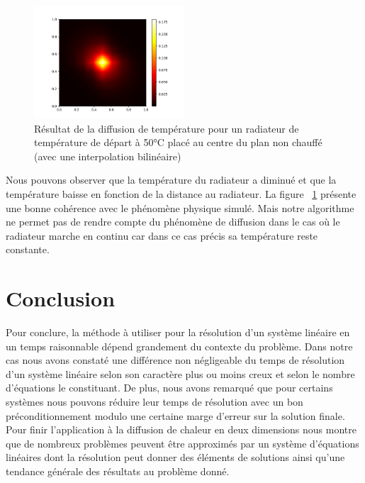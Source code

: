 \documentclass{article}
\begin{document}
\begin{figure}[htbp]
  \centering
  \includegraphics[width=0.5\textwidth]{images/radiateur_centre.png}
  \caption{Résultat de la diffusion de température pour un radiateur de température de départ à 50°C placé au centre du plan non chauffé (avec une interpolation bilinéaire)}
  \label{fig:radiateur_centre}
\end{figure}%

Nous pouvons observer que la température du radiateur a diminué et que la température baisse en fonction de la distance au radiateur. La figure ~\ref{fig:radiateur_centre} présente une bonne cohérence avec le phénomène physique simulé. Mais notre algorithme ne permet pas de rendre compte du phénomène de diffusion dans le cas où le radiateur marche en continu car dans ce cas précis sa température reste constante.







\section*{Conclusion}
Pour conclure, la méthode à utiliser pour la résolution d'un système linéaire en un temps raisonnable dépend grandement du contexte du problème. Dans notre cas nous avons constaté une différence non négligeable du temps de résolution d'un système linéaire selon son caractère plus ou moins creux et selon le nombre d'équations le constituant. De plus, nous avons remarqué que pour certains systèmes nous pouvons réduire leur temps de résolution avec un bon préconditionnement modulo une certaine marge d'erreur sur la solution finale. Pour finir l'application à la diffusion de chaleur en deux dimensions nous montre que de nombreux problèmes peuvent être approximés par un système d'équations linéaires dont la résolution peut donner des éléments de solutions ainsi qu'une tendance générale des résultats au problème donné.
\end{document}
